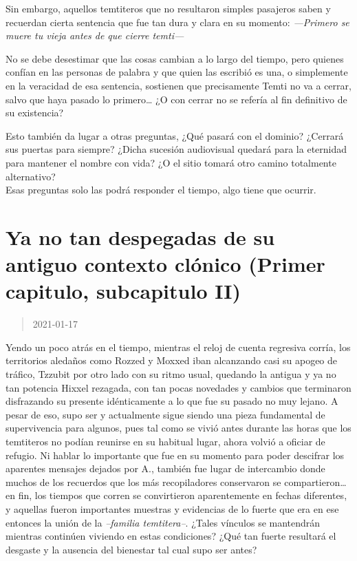 \documentclass[
  spanish,
]{book}
\begin{document}
Sin embargo, aquellos temtiteros que no resultaron simples pasajeros saben y recuerdan cierta sentencia que fue tan dura y clara en su momento: \emph{---Primero se muere tu vieja antes de que cierre temti---}

No se debe desestimar que las cosas cambian a lo largo del tiempo, pero quienes confían en las personas de palabra y que quien las escribió es una, o simplemente en la veracidad de esa sentencia, sostienen que precisamente Temti no va a cerrar, salvo que haya pasado lo primero\ldots{} ¿O con cerrar no se refería al fin definitivo de su existencia?

Esto también da lugar a otras preguntas, ¿Qué pasará con el dominio? ¿Cerrará sus puertas para siempre? ¿Dicha sucesión audiovisual quedará para la eternidad para mantener el nombre con vida? ¿O el sitio tomará otro camino totalmente alternativo?\\
Esas preguntas solo las podrá responder el tiempo, algo tiene que ocurrir.

\hypertarget{ya-no-tan-despegadas-de-su-antiguo-contexto-cluxf3nico-primer-capitulo-subcapitulo-ii}{%
\section{Ya no tan despegadas de su antiguo contexto clónico (Primer capitulo, subcapitulo II)}\label{ya-no-tan-despegadas-de-su-antiguo-contexto-cluxf3nico-primer-capitulo-subcapitulo-ii}}

\begin{quote}
2021-01-17
\end{quote}

Yendo un poco atrás en el tiempo, mientras el reloj de cuenta regresiva corría, los territorios aledaños como Rozzed y Moxxed iban alcanzando casi su apogeo de tráfico, Tzzubit por otro lado con su ritmo usual, quedando la antigua y ya no tan potencia Hixxel rezagada, con tan pocas novedades y cambios que terminaron disfrazando su presente idénticamente a lo que fue su pasado no muy lejano.
A pesar de eso, supo ser y actualmente sigue siendo una pieza fundamental de supervivencia para algunos, pues tal como se vivió antes durante las horas que los temtiteros no podían reunirse en su habitual lugar, ahora volvió a oficiar de refugio. Ni hablar lo importante que fue en su momento para poder descifrar los aparentes mensajes dejados por A., también fue lugar de intercambio donde muchos de los recuerdos que los más recopiladores conservaron se compartieron\ldots{} en fin, los tiempos que corren se convirtieron aparentemente en fechas diferentes, y aquellas fueron importantes muestras y evidencias de lo fuerte que era en ese entonces la unión de la \emph{--familia temtitera--}. ¿Tales vínculos se mantendrán mientras continúen viviendo en estas condiciones? ¿Qué tan fuerte resultará el desgaste y la ausencia del bienestar tal cual supo ser antes?
\end{document}
